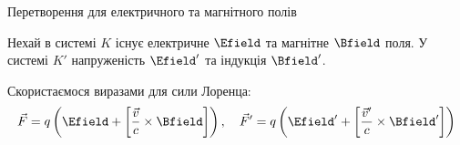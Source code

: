 \documentclass[]{beamer}
\let\vect\vec
\begin{document}
\begin{frame}{Перетворення для електричного та магнітного полів}{}
	\begin{block}{}\justifying
		Нехай в системі $ K $ існує електричне $ \Efield $ та магнітне $ \Bfield $ поля. У системі $ K' $ напруженість $ \Efield' $ та індукція $
			\Bfield' $.
	\end{block}
	\begin{overprint}
		\begin{block}{}\justifying\scriptsize
			Скористаємося виразами для сили Лоренца:
			\begin{equation*}
				\vect{F} = q\left( \Efield + \left[ \frac{\vect{v}}{c}\times\Bfield\right] \right) , \quad
				\vect{F}' = q\left( \Efield' + \left[ \frac{\vect{v}'}{c}\times\Bfield'\right] \right)
			\end{equation*}


\end{block}
\end{overprint}
\end{frame}
\end{document}

